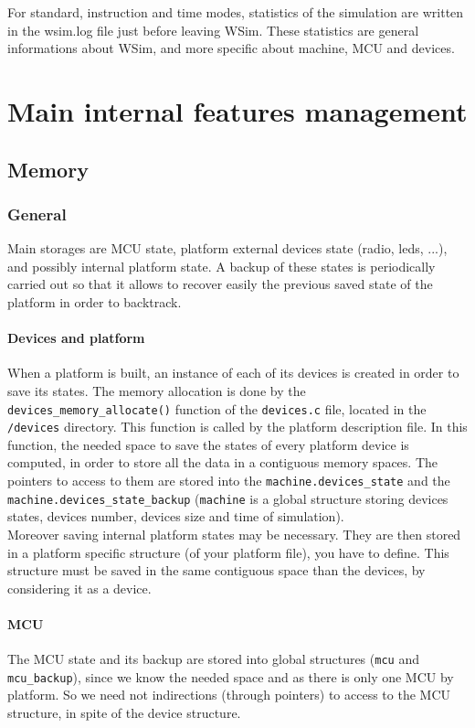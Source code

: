 \documentclass[a4paper,10pt]{report}
\begin{document}
For standard, instruction and time modes, statistics of the simulation are written in the wsim.log file just before leaving WSim. These statistics are general informations about WSim, and more specific about machine, MCU and devices.


\chapter{Main internal features management}

\section{Memory}
\subsection{General}
Main storages are MCU state, platform external devices state (radio, leds, ...), and possibly internal platform state. A backup of these states is periodically carried out so that it allows to recover easily the previous saved state of the platform in order to backtrack.

\subsubsection{Devices and platform}
When a platform is built, an instance of each of its devices is created in order to save its states. The memory allocation  is done by the \verb$devices_memory_allocate()$ function of the \verb$devices.c$ file, located in the \verb$/devices$ directory. This function is called by the platform description file. In this function, the needed space to save the states of every platform device is computed, in order to store all the data in a contiguous memory spaces.  The pointers to access to them are stored into the \verb$machine.devices_state$ and the \verb$machine.devices_state_backup$ (\verb$machine$ is a global structure storing devices states, devices number, devices size and time of simulation).\\

Moreover saving internal platform states may be necessary. They are then stored in a platform specific structure (of your platform file), you have to define. This structure must be saved in the same contiguous space than the devices, by considering it as a device.

\subsubsection{MCU}
The MCU state and its backup are stored into global structures (\verb$mcu$ and \verb$mcu_backup$), since we know the needed space and as there is only one MCU by platform. So we need not indirections (through pointers) to access to the MCU structure, in spite of the device structure.
\end{document}
